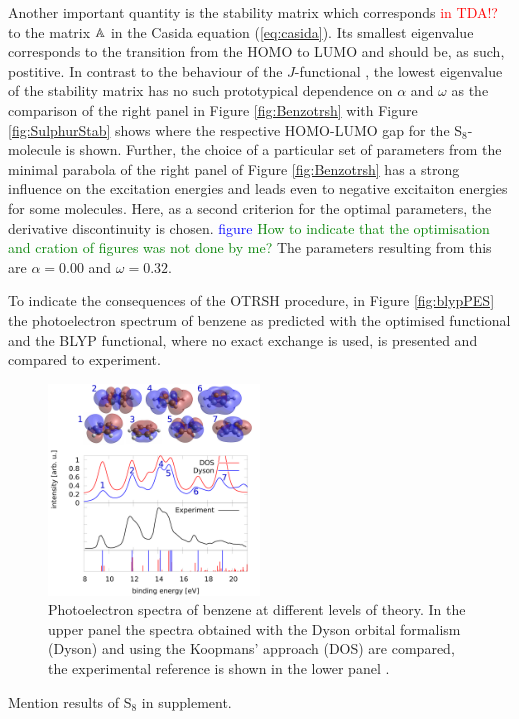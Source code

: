 Another important quantity is the stability matrix which corresponds \textcolor{red}{in TDA!?} to the matrix $\mathbb{A}$ in the Casida equation (\ref{eq:casida}).
Its smallest eigenvalue corresponds to the transition from the HOMO to LUMO and should be, as such, postitive.
In contrast to the behaviour of the $J$-functional , the lowest eigenvalue of the stability matrix has no such prototypical dependence on $\alpha$ and $\omega$ as the comparison of the right panel in Figure \ref{fig:Benzotrsh} with Figure \ref{fig:SulphurStab} shows where the respective HOMO-LUMO gap for the S$_8$-molecule is shown.
Further, the choice of a particular set of parameters from the minimal parabola of the right panel of Figure \ref{fig:Benzotrsh} has a strong influence on the excitation energies and leads even to negative excitaiton energies for some molecules.
Here, as a second criterion for the optimal parameters, the derivative discontinuity is chosen.
\textcolor{blue}{figure}
\textcolor{green}{How to indicate that the optimisation and cration of figures was not done by me?}
The parameters resulting from this are $\alpha=0.00$ and $\omega=0.32$.

To indicate the consequences of the OTRSH procedure, in Figure \ref{fig:blypPES} the photoelectron spectrum of benzene as predicted with the optimised functional and the BLYP functional, where no exact exchange is used, is presented and compared to experiment.

\begin{figure}
\includegraphics[width=0.5\textwidth]{Figures/Benzene/Benzene}
\caption{Photoelectron spectra of benzene at different levels of theory.
In the upper panel the spectra obtained with the Dyson orbital formalism (Dyson) and using the Koopmans' approach (DOS) are compared, the experimental reference is shown in the lower panel \cite{BenzExp}.}
\label{fig:benzPES}
\end{figure}

Mention results of S$_8$ in supplement.
